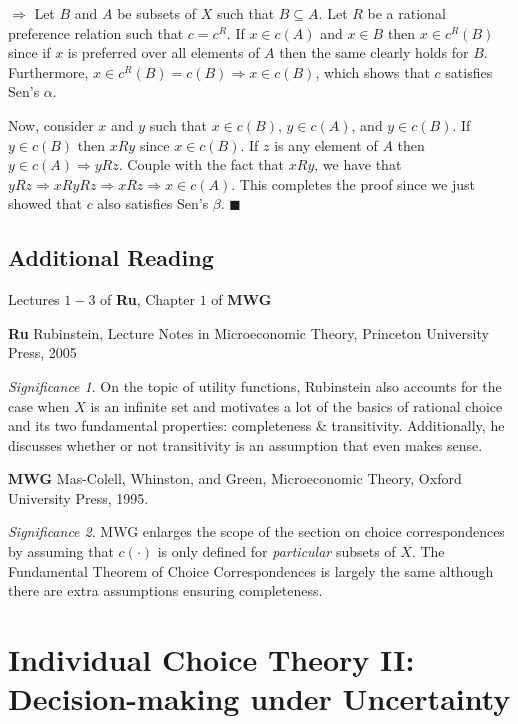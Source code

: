 \documentclass[12pt]{article}
\theoremstyle{plain}
\theoremstyle{definition}
\theoremstyle{remark}
\newtheorem*{signif}{Significance}
\newcommand{\3}{\vspace*{3mm}}
\newcommand{\RIGHT}{\Longrightarrow}
\newcommand{\QED}{\blacksquare}
\begin{document}
$\RIGHT $ Let $B$ and $A$ be subsets of $X$ such that $B \subseteq A$. Let $R$ be a rational preference relation such that $c = c^R$. If $x \in c(A)$ and $x \in B$ then $x \in c^R(B)$ since if $x$ is preferred over all elements of $A$ then the same clearly holds for $B$. Furthermore, $x \in c^R(B) = c(B) \RIGHT x \in c(B)$, which shows that $c$ satisfies Sen's $\alpha$. 


Now, consider $x$ and $y$ such that $x \in c(B)$, $y \in c(A)$, and $y \in c(B)$.  If $y \in c(B)$ then $x R y$ since $x \in c(B)$. If $z$ is any element of $A$ then $y \in c(A) \RIGHT y R z$. Couple with the fact that $x R y$, we have that $y R z \RIGHT x R y R z \RIGHT x R z \RIGHT x \in c(A)$. This completes the proof since we just showed that $c$ also satisfies Sen's $\beta$. $\QED$


\subsection{Additional Reading }

Lectures $1-3$ of \textbf{Ru}, Chapter $1$ of \textbf{MWG}

\textbf{Ru} Rubinstein, Lecture Notes in Microeconomic Theory, Princeton University Press,
2005

\begin{signif}
On the topic of utility functions, Rubinstein also accounts for the case when $X$ is an infinite set and motivates a lot of the basics of rational choice and its two fundamental properties: completeness \& transitivity. Additionally, he discusses whether or not transitivity is an assumption that even makes sense. 


\end{signif}

\textbf{MWG} Mas-Colell, Whinston, and Green, Microeconomic Theory, Oxford University Press, 1995.

\begin{signif}

MWG enlarges the scope of the section on choice correspondences by assuming that $c(\cdot)$ is only defined for \emph{particular} subsets of $X$. The Fundamental Theorem of Choice Correspondences is largely the same although there are extra assumptions ensuring completeness. 
\end{signif}

\newpage

\section{Individual Choice Theory II: Decision-making under Uncertainty} 
\end{document}
